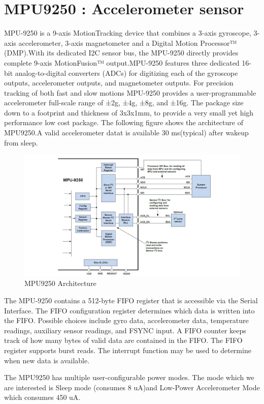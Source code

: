 \section{MPU9250 : Accelerometer sensor}\label{mpu9250_def}
MPU-9250 is a 9-axis MotionTracking device that combines a 3-axis gyroscope, 3-axis accelerometer, 3-axis magnetometer and a Digital Motion Processor™ (DMP).With its dedicated I2C sensor bus, the MPU-9250 directly provides complete 9-axis MotionFusion™ output.MPU-9250 features three dedicated 16-bit analog-to-digital converters (ADCs) for digitizing each of the gyroscope outputs, accelerometer outputs, and magnetometer outputs. For precision tracking of both fast and slow motions MPU-9250 provides a user-programmable accelerometer full-scale range of ±2g, ±4g, ±8g, and ±16g. The package size down to a footprint and thickness of 3x3x1mm, to provide a very small yet high performance low cost package. The following figure shows the architecture of MPU9250.A valid accelerometer datat is available 30 ms(typical) after wakeup from sleep.
\begin{figure}[h]
	\centering
	\includegraphics[scale = 0.5 ]{MPU9250.JPG}
	\caption{MPU9250 Architecture\label{mpu9250}}
\end{figure}

The MPU-9250 contains a 512-byte FIFO register that is accessible via the Serial Interface. The FIFO configuration register determines which data is written into the FIFO. Possible choices include gyro data, accelerometer data, temperature readings, auxiliary sensor readings, and FSYNC input. A FIFO counter keeps track of how many bytes of valid data are contained in the FIFO. The FIFO register supports burst reads. The interrupt function may be used to determine when new data is available.

The MPU9250 has multiple user-configurable power modes. The mode which we are interested is Sleep mode (consumes 8 uA)and Low-Power Accelerometer Mode which consumes 450 uA. 
 
